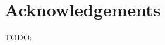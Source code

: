 \documentclass[letterpaper]{sig-alternate}
\begin{document}



\section{Acknowledgements}
 TODO:


\end{document}
